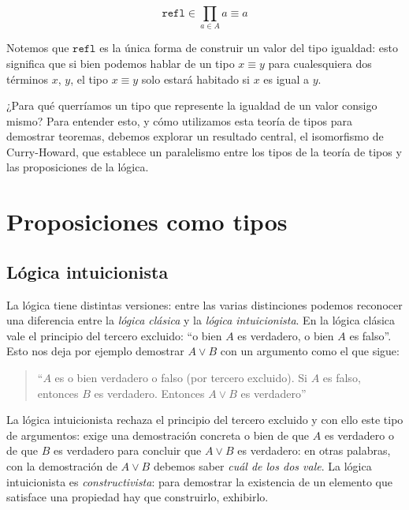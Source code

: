 \documentclass[11pt]{article} %
\begin{document}
\[
  \texttt{refl} \in \prod_{a \in A} a \equiv a
\]

Notemos que $\texttt{refl}$ es la única forma de construir un valor del tipo igualdad: esto significa que si bien podemos hablar de un tipo $x \equiv y$ para cualesquiera dos términos $x$, $y$, el tipo $x ≡ y$ solo estará habitado si $x$ es igual a $y$.

¿Para qué querríamos un tipo que represente la igualdad de un valor consigo mismo? Para entender esto, y cómo utilizamos esta teoría de tipos para demostrar teoremas, debemos explorar un resultado central, el isomorfismo de Curry-Howard, que establece un paralelismo entre los tipos de la teoría de tipos y las proposiciones de la lógica.

\section{Proposiciones como tipos}
\subsection{Lógica intuicionista}
La lógica tiene distintas versiones: entre las varias distinciones podemos reconocer una diferencia entre la \textit{lógica clásica} y la \textit{lógica intuicionista}. En la lógica clásica vale el principio del tercero excluido: ``o bien $A$ es verdadero, o bien $A$ es falso''. Esto nos deja por ejemplo demostrar $A \vee B$ con un argumento como el que sigue:

\begin{quotation}
``$A$ es o bien verdadero o falso (por tercero excluido). Si $A$ es falso, entonces $B$ es verdadero. Entonces $A ∨ B$ es verdadero''
\end{quotation}

La lógica intuicionista rechaza el principio del tercero excluido y con ello este tipo de argumentos: exige una demostración concreta o bien de que $A$ es verdadero o de que $B$ es verdadero para concluir que $A \vee B$ es verdadero: en otras palabras, con la demostración de $A ∨ B$ debemos saber \textit{cuál de los dos vale}. La lógica intuicionista es \textit{constructivista}: para demostrar la existencia de un elemento que satisface una propiedad hay que construirlo, exhibirlo.
\end{document}
